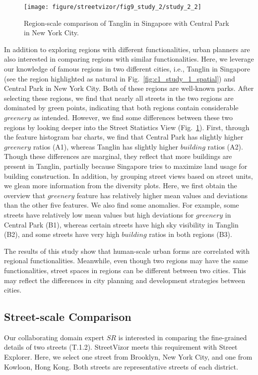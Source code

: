 \begin{figure}[t]
	\centering
	\texttt{[image: figure/streetvizor/fig9\_study\_2/study\_2\_2]}
	\vspace{-7mm}
	\caption{Region-scale comparison of Tanglin in Singapore with Central Park in New York City.}
	\label{fig:c1_center-park-tanglin}
	\vspace{-5mm}
\end{figure}

In addition to exploring regions with different functionalities, urban planners are also interested in comparing regions with similar functionalities.
Here, we leverage our knowledge of famous regions in two different cities, i.e., Tanglin in Singapore (see the region highlighted as natural in Fig.~\ref{fig:c1_study_1_spatial}) and Central Park in New York City.
Both of these regions are well-known parks.
After selecting these regions, we find that nearly all streets in the two regions are dominated by green points, indicating that both regions contain considerable $greenery$ as intended.
However, we find some differences between these two regions by looking deeper into the Street Statistics View (Fig.~\ref{fig:c1_center-park-tanglin}).
First, through the feature histogram bar charts, we find that Central Park has slightly higher $greenery$ ratios (A1), whereas Tanglin has slightly higher $building$ ratios (A2).
Though these differences are marginal, they reflect that more buildings are present in Tanglin, partially because Singapore tries to maximize land usage for building construction.
In addition, by grouping street views based on street units, we glean more information from the diversity plots.
Here, we first obtain the overview that $greenery$ feature has relatively higher mean values and deviations than the other five features.
We also find some anomalies.
For example, some streets have relatively low mean values but high deviations for $greenery$ in Central Park (B1), whereas certain streets have high sky visibility in Tanglin (B2), and some streets have very high $building$ ratios in both regions (B3).

The results of this study show that human-scale urban forms are correlated with regional functionalities.
Meanwhile, even though two regions may have the same functionalities, street spaces in regions can be different between two cities.
This may reflect the differences in city planning and development strategies between cities.


\subsection{Street-scale Comparison}
Our collaborating domain expert $SR$ is interested in comparing the fine-grained details of two streets (T.1.2).
StreetVizor meets this requirement with Street Explorer.
Here, we select one street from Brooklyn, New York City, and one from Kowloon, Hong Kong.
Both streets are representative streets of each district.

